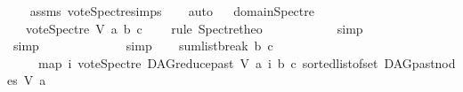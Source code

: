 \begin{isabellebody}
%
\isadelimproof
\ \ %
\endisadelimproof
%
\isatagproof
{}\isamarkupfalse%
\ assms\ vote{\isacharunderscore}{\kern0pt}Spectre{\isachardot}{\kern0pt}simps\isanewline
\ \ \isamarkupfalse%
\ auto%
\endisatagproof
{\isafoldproof}%
%
\isadelimproof
\ \isanewline
%
\endisadelimproof
\isanewline
{}\isamarkupfalse%
\ domain{\isacharunderscore}{\kern0pt}Spectre{\isacharcolon}{\kern0pt}\isanewline
\ \ \ {\isachardoublequoteopen}vote{\isacharunderscore}{\kern0pt}Spectre\ V\ a\ b\ c\ {\isasymin}\ {\isacharbraceleft}{\kern0pt}{\isacharminus}{\kern0pt}{}{\isacharcomma}{\kern0pt}\ {}{\isacharcomma}{\kern0pt}\ {}{\isacharbraceright}{\kern0pt}{\isachardoublequoteclose}\isanewline
%
\isadelimproof
%
\endisadelimproof
%
\isatagproof
{}\isamarkupfalse%
{\isacharparenleft}{\kern0pt}rule\ Spectre{\isacharunderscore}{\kern0pt}theo{\isacharparenright}{\kern0pt}\isanewline
\ \ \isamarkupfalse%
\ {\isachardoublequoteopen}{}\ {\isasymin}\ {\isacharbraceleft}{\kern0pt}{\isacharminus}{\kern0pt}\ {}{\isacharcomma}{\kern0pt}\ {}{\isacharcomma}{\kern0pt}\ {}{\isacharbraceright}{\kern0pt}{\isachardoublequoteclose}\ \isamarkupfalse%
\ simp\isanewline
\ \ \isamarkupfalse%
\ {\isachardoublequoteopen}{}\ {\isasymin}\ {\isacharbraceleft}{\kern0pt}{\isacharminus}{\kern0pt}\ {}{\isacharcomma}{\kern0pt}\ {}{\isacharcomma}{\kern0pt}\ {}{\isacharbraceright}{\kern0pt}{\isachardoublequoteclose}\ \isamarkupfalse%
\ simp\isanewline
\ \ \isamarkupfalse%
\ {\isachardoublequoteopen}\ {\isacharminus}{\kern0pt}\ {}\ {\isasymin}\ {\isacharbraceleft}{\kern0pt}{\isacharminus}{\kern0pt}\ {}{\isacharcomma}{\kern0pt}\ {}{\isacharcomma}{\kern0pt}\ {}{\isacharbraceright}{\kern0pt}{\isachardoublequoteclose}\ \isamarkupfalse%
\ simp\isanewline
\ \ \isamarkupfalse%
\ {\isachardoublequoteopen}sumlist{\isacharunderscore}{\kern0pt}break\ b\ c\isanewline
\ \ \ \ \ {\isacharparenleft}{\kern0pt}map\ {\isacharparenleft}{\kern0pt}{\isasymlambda}i{\isachardot}{\kern0pt}\ vote{\isacharunderscore}{\kern0pt}Spectre\ {\isacharparenleft}{\kern0pt}DAG{\isachardot}{\kern0pt}reduce{\isacharunderscore}{\kern0pt}past\ V\ a{\isacharparenright}{\kern0pt}\ i\ b\ c{\isacharparenright}{\kern0pt}\ {\isacharparenleft}{\kern0pt}sorted{\isacharunderscore}{\kern0pt}list{\isacharunderscore}{\kern0pt}of{\isacharunderscore}{\kern0pt}set\ {\isacharparenleft}{\kern0pt}DAG{\isachardot}{\kern0pt}past{\isacharunderscore}{\kern0pt}nodes\ V\ a{\isacharparenright}{\kern0pt}{\isacharparenright}{\kern0pt}{\isacharparenright}{\kern0pt}\isanewline

\end{isabellebody}
